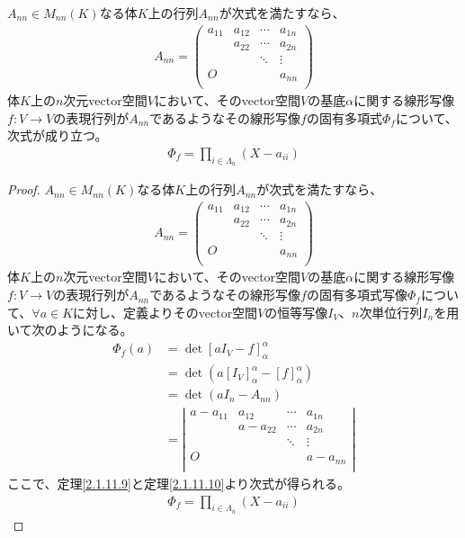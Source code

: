 \documentclass[dvipdfmx]{jsarticle}
\begin{document}
\begin{thm}\label{2.2.2.7}
$A_{nn} \in M_{nn}(K)$なる体$K$上の行列$A_{nn}$が次式を満たすなら、
\begin{align*}
A_{nn} = \begin{pmatrix}
a_{11} & a_{12} & \cdots & a_{1n} \\
\  & a_{22} & \cdots & a_{2n} \\
\  & \  & \ddots & \vdots \\
O & \  & \  & a_{nn} \\
\end{pmatrix}
\end{align*}
体$K$上の$n$次元vector空間$V$において、そのvector空間$V$の基底$\alpha$に関する線形写像$f:V \rightarrow V$の表現行列が$A_{nn}$であるようなその線形写像$f$の固有多項式$\varPhi_{f}$について、次式が成り立つ。
\begin{align*}
\varPhi_{f} = \prod_{i \in \varLambda_{n}} \left( X - a_{ii} \right)
\end{align*}
\end{thm}
\begin{proof}
$A_{nn} \in M_{nn}(K)$なる体$K$上の行列$A_{nn}$が次式を満たすなら、
\begin{align*}
A_{nn} = \begin{pmatrix}
a_{11} & a_{12} & \cdots & a_{1n} \\
\  & a_{22} & \cdots & a_{2n} \\
\  & \  & \ddots & \vdots \\
O & \  & \  & a_{nn} \\
\end{pmatrix}
\end{align*}
体$K$上の$n$次元vector空間$V$において、そのvector空間$V$の基底$\alpha$に関する線形写像$f:V \rightarrow V$の表現行列が$A_{nn}$であるようなその線形写像$f$の固有多項式写像$\varPhi_{f}$について、$\forall a \in K$に対し、定義よりそのvector空間$V$の恒等写像$I_{V}$、$n$次単位行列$I_{n}$を用いて次のようになる。
\begin{align*}
\varPhi_{f}(a) &= \det\left[ aI_{V} - f \right]_{\alpha}^{\alpha}\\
&= \det\left( a\left[ I_{V} \right]_{\alpha}^{\alpha} - [ f]_{\alpha}^{\alpha} \right)\\
&= \det\left( aI_{n} - A_{nn} \right)\\
&= \left| \begin{matrix}
a - a_{11} & a_{12} & \cdots & a_{1n} \\
\  & a - a_{22} & \cdots & a_{2n} \\
\  & \  & \ddots & \vdots \\
O & \  & \  & a - a_{nn} \\
\end{matrix} \right|
\end{align*}
ここで、定理\ref{2.1.11.9}と定理\ref{2.1.11.10}より次式が得られる。
\begin{align*}
\varPhi_{f} = \prod_{i \in \varLambda_{n}} \left( X - a_{ii} \right)
\end{align*}
\end{proof}
\end{document}
